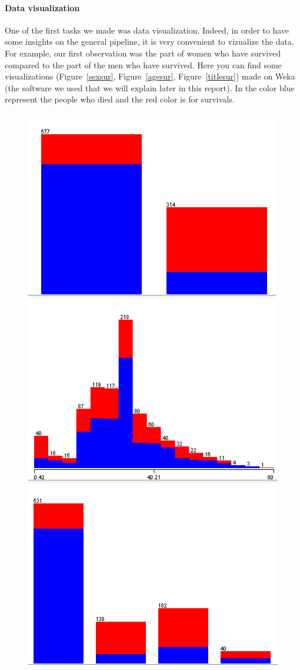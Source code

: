 \documentclass[11pt,a4paper,portrait]{article}
\begin{document}
\paragraph{Data visualization}
One of the first tasks we made was data visualization. Indeed, in order to have some insights on the general pipeline, it is very convenient to vizualize the data. For example, our first observation was the part of women who have survived compared to the part of the men who have survived. Here you can find some visualizations (Figure~\ref{sexsur}, Figure~\ref{agesur}, Figure~\ref{titlesur}) made on Weka (the software we used that we will explain later in this report). In the color blue represent the people who died and the red color is for survivals.
\begin{figure}

	\includegraphics[scale=0.6]{sexsur.png}
	\includegraphics[scale=0.6]{agesur.png}
	\includegraphics[scale=0.6]{titlesur.png}
	

\end{figure}
\end{document}
